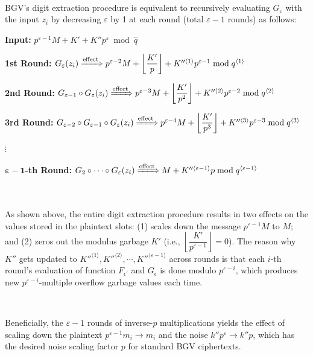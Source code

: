 \begin{enumerate}
$ $

BGV's digit extraction procedure is equivalent to recursively evaluating $G_{\varepsilon}$ with the input $z_i$ by decreasing $\varepsilon$ by 1 at each round (total $\varepsilon-1$ rounds) as follows:

\textbf{Input:} $p^{\varepsilon - 1}M + K' + K''p^{\varepsilon} \bmod \hat{q}$

\textbf{1st Round:} $G_{\varepsilon}(z_i) \xRightarrow{\text{effect}}  p^{\varepsilon - 2}M + \left\lfloor\dfrac{K'}{p}\right\rfloor + K''^{\langle 1 \rangle}p^{\varepsilon-1} \bmod q^{\langle 1 \rangle}$

\textbf{2nd Round:} $G_{\varepsilon-1} \circ G_{\varepsilon}(z_i) \xRightarrow{\text{effect}}  p^{\varepsilon - 3}M + \left\lfloor\dfrac{K'}{p^2}\right\rfloor + K''^{\langle 2 \rangle}p^{\varepsilon-2} \bmod q^{\langle 2 \rangle}$

\textbf{3rd Round:} $G_{\varepsilon-2} \circ G_{\varepsilon-1} \circ G_{\varepsilon}(z_i)  \xRightarrow{\text{effect}}  p^{\varepsilon - 4}M + \left\lfloor\dfrac{K'}{p^3}\right\rfloor + K''^{\langle 3 \rangle}p^{\varepsilon-3} \bmod q^{\langle 3 \rangle}$

$\vdots$

\textbf{$\bm{\varepsilon - 1}$-th Round:} $G_{2}\circ \cdots \circ G_{\varepsilon} (z_i) \xRightarrow{\text{effect}}  M + K''^{\langle \varepsilon - 1 \rangle}p \bmod q^{\langle \varepsilon - 1 \rangle}$

$ $

As shown above, the entire digit extraction procedure results in two effects on the values stored in the plaintext slots: (1) scales down the message $p^{\varepsilon - 1}M$ to $M$; and (2) zeros out the modulus garbage $K'$ (i.e., $\left\lfloor\dfrac{K'}{p^{\varepsilon - 1}}\right\rfloor = 0$). The reason why $K''$ gets updated to $K''^{\langle 1 \rangle}, K''^{\langle 2 \rangle}, \cdots, K''^{\langle \varepsilon -1 \rangle}$ across rounds is that each $i$-th round's evaluation of function $F_{\epsilon'}$ and $G_{\epsilon}$ is done modulo $p^{\varepsilon - i}$, which produces new $p^{\varepsilon - i}$-multiple overflow garbage values each time. 

$ $












Beneficially, the $\varepsilon - 1$ rounds of inverse-$p$ multiplications yields the effect of scaling down the plaintext $p^{\varepsilon-1}m_i \rightarrow m_i$ and the noise $k''p^{\varepsilon} \rightarrow k''p$, which has the desired noise scaling factor $p$ for standard BGV ciphertexts. 


\end{enumerate}

